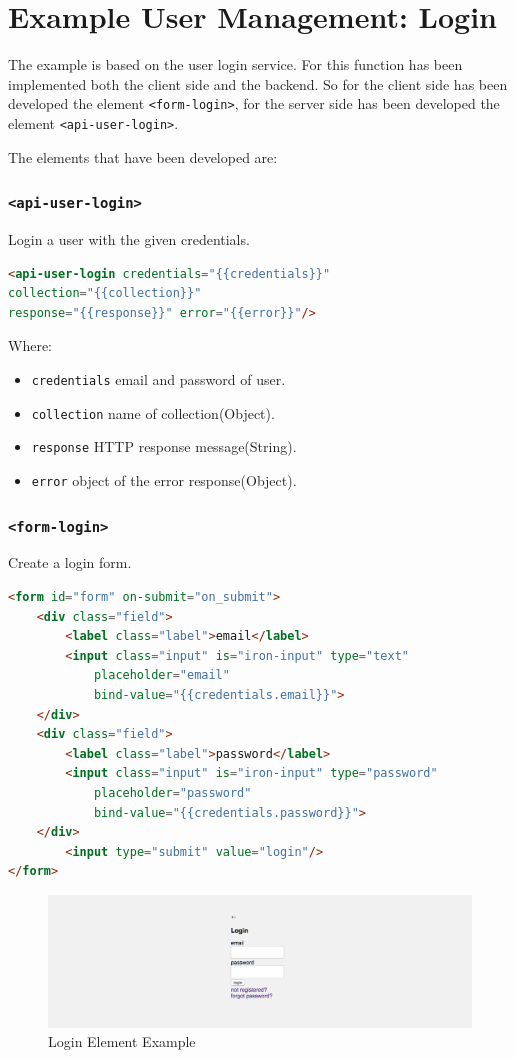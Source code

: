 \section{Example User Management: Login}
\label{sec:XPR_exmpl}

The example is based on the user login service. 
For this function has been implemented both the client side and the backend. So for the client side has been developed the element \texttt{<form-login>}, for the server side has been developed the element \texttt{<api-user-login>}.

The elements that have been developed are:

\subsubsection{\texttt{<api-user-login>}}

Login a user with the given credentials.

\begin{lstlisting}[language=html]
<api-user-login credentials="{{credentials}}"
collection="{{collection}}" 
response="{{response}}" error="{{error}}"/>
\end{lstlisting}
Where:
\begin{itemize}
\item \texttt{credentials} email and password of user.
\item \texttt{collection} name of collection(Object).
\item \texttt{response}	HTTP response message(String).
\item \texttt{error} object of the error response(Object).
\end{itemize}

\subsubsection{\texttt{<form-login>}}

Create a login form.

\begin{lstlisting}[language=html]
<form id="form" on-submit="on_submit">
    <div class="field">
        <label class="label">email</label>
        <input class="input" is="iron-input" type="text" 
    		placeholder="email" 
            bind-value="{{credentials.email}}">
    </div>
    <div class="field">
        <label class="label">password</label>
        <input class="input" is="iron-input" type="password" 
        	placeholder="password" 
        	bind-value="{{credentials.password}}">
    </div>
      	<input type="submit" value="login"/>
</form>
\end{lstlisting}


\begin {figure}[h]
\graphicspath{{images/chapter_USR/}}
\includegraphics[width=\textwidth]{usr1}
\caption{Login Element Example}
\end {figure}